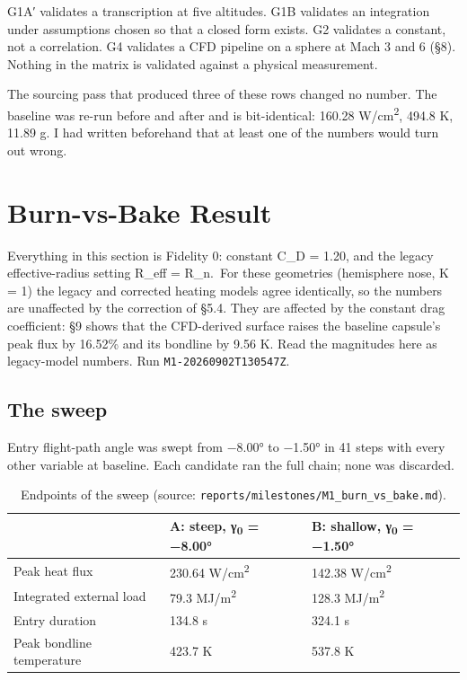 \documentclass[
  a4paper,
  11pt]{article}
\newcommand{\tabhead}[1]{{\sffamily\bfseries\fontsize{8.5}{10.5}\selectfont #1}}
\begin{document}
G1A{\symfont ′} validates a transcription at five altitudes. G1B
validates an integration under assumptions chosen so that a closed form
exists. G2 validates a constant, not a correlation. G4 validates a CFD
pipeline on a sphere at Mach 3 and 6 (§8). Nothing in the matrix is
validated against a physical measurement.

The sourcing pass that produced three of these rows changed no number.
The baseline was re-run before and after and is bit-identical: 160.28
W/cm\textsuperscript{2}, 494.8 K, 11.89 g. I had written beforehand that
at least one of the numbers would turn out wrong.

\section{Burn-vs-Bake Result}

Everything in this section is Fidelity 0: constant C\_D = 1.20, and the
legacy effective-radius setting R\_eff = R\_n.~For these geometries
(hemisphere nose, K = 1) the legacy and corrected heating models agree
identically, so the numbers are unaffected by the correction of §5.4.
They are affected by the constant drag coefficient: §9 shows that the
CFD-derived surface raises the baseline capsule's peak flux by 16.52\%
and its bondline by 9.56 K. Read the magnitudes here as legacy-model
numbers. Run \texttt{M1-\allowbreak{}20260902T130547Z}.

\subsection{The sweep}

Entry flight-path angle was swept from −8.00° to −1.50° in 41 steps with
every other variable at baseline. Each candidate ran the full chain;
none was discarded.

\begin{table}[htbp]
\caption{Endpoints of the sweep (source:
\texttt{reports/\allowbreak{}milestones/\allowbreak{}M1\_\allowbreak{}burn\_\allowbreak{}vs\_\allowbreak{}bake.md}).}
\small\centering
\begin{tabular}{@{}lll@{}}
\toprule
 & \tabhead{A: steep, γ\textsubscript{0} = −8.00°} & \tabhead{B: shallow, γ\textsubscript{0} = −1.50°} \\
\midrule
Peak heat flux & 230.64 W/cm\textsuperscript{2} & 142.38 W/cm\textsuperscript{2} \\
Integrated external load & 79.3 MJ/m\textsuperscript{2} & 128.3 MJ/m\textsuperscript{2} \\
Entry duration & 134.8 s & 324.1 s \\
Peak bondline temperature & 423.7 K & 537.8 K \\
\bottomrule
\end{tabular}
\end{table}
\end{document}
